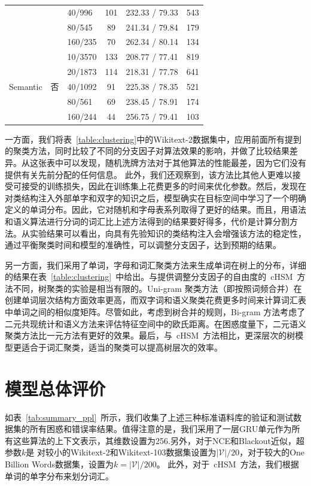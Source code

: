 \begin{table}[!ht]
\begin{tabular}{lclccc}
    &&40/996 &101&232.33 / 79.33&543\\
    &&80/545 &89&241.34 / 79.84&179\\
    &&160/235 &70&262.34 / 80.14&134\\
  \midrule
  \multirow{5}{*}{Semantic}  &\multirow{5}{*}{否} &10/3570 &133&208.77 / 77.41&819\\
    & &20/1873 &114&218.31 / 77.78&641\\
    & &40/1092 &91&225.38 / 78.35&521\\
    & &80/561 &69&238.45 / 78.91&174\\
    & &160/244 &44&256.75 / 79.41&103\\
\bottomrule
  \end{tabular}
\end{table}

一方面，我们将表~\ref{table:clustering}中的Wikitext-2数据集中，应用前面所有提到的聚类方法，同时比较了不同的分支因子对算法效果的影响，并做了比较结果差异。从这张表中可以发现，随机洗牌方法对于其他算法的性能最差，因为它们没有提供有关先前分配的任何信息。
此外，我们还观察到，该方法比其他人更难以接受可接受的训练损失，因此在训练集上花费更多的时间来优化参数。然后，发现在对类结构注入外部单字和双字的知识之后，模型确实在目标空间中学习了一个明确定义的单词分布。因此，它对随机和字母表系列取得了更好的结果。而且，用语法和语义算法进行分词的词汇比上述方法得到的结果要好得多，代价是计算分割方法。从实验结果可以看出，向具有先验知识的类结构注入会增强该方法的稳定性，通过平衡聚类时间和模型的准确性，可以调整分支因子，达到预期的结果。



另一方面，我们采用了单词，字母和词汇聚类方法来生成单词在树上的分布，详细的结果在表~\ref{table:clustering}~中给出。与提供调整分支因子的自由度的~cHSM~方法不同，树聚类的实验是相当有限的。Uni-gram 聚类方法（即按照词频合并）在创建单词层次结构方面效率更高，而双字词和语义聚类花费更多时间来计算词汇表中单词之间的相似度矩阵。尽管如此，考虑到树合并的规则，Bi-gram 方法考虑了二元共现统计和语义方法来评估特征空间中的欧氏距离。在困惑度量下，二元语义聚类方法比一元方法有更好的效果。最后，与~cHSM~方法相比，更深层次的树模型更适合于词汇聚类，适当的聚类可以提高树层次的效率。

\section{模型总体评价}
如表~\ref{tab:summary_ppl}~所示，我们收集了上述三种标准语料库的验证和测试数据集的所有困惑和错误率结果。值得注意的是，我们采用了一层GRU单元作为所有这些算法的上下文表示，其维数设置为256.另外，对于NCE和Blackout近似，超参数$ k $是 对较小的Wikitext-2和Wikitext-103数据集设置为$\mathcal{|V|}/20 $，对于较大的One Billion Words数据集，设置为$ k=|\mathcal{V}|/200 $。 此外，对于~cHSM~方法，我们根据单词的单字分布来划分词汇。

